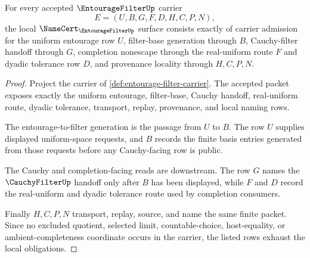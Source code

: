 \begin{theorem}
\label{thm:entourage-filter-namecert-obligations}
For every accepted $\EntourageFilterUp$ carrier
$$
E=(U,B,G,F,D,H,C,P,N),
$$
the local $\NameCert_{\EntourageFilterUp}$ surface consists exactly of carrier admission for the uniform entourage row $U$, filter-base generation through $B$, Cauchy-filter handoff through $G$, completion nonescape through the real-uniform route $F$ and dyadic tolerance row $D$, and provenance locality through $H,C,P,N$.
\end{theorem}
\begin{proof}
Project the carrier of \autoref{def:entourage-filter-carrier}. The accepted packet exposes exactly the uniform entourage, filter-base, Cauchy handoff, real-uniform route, dyadic tolerance, transport, replay, provenance, and local naming rows.

The entourage-to-filter generation is the passage from $U$ to $B$. The row $U$ supplies displayed uniform-space requests, and $B$ records the finite basis entries generated from those requests before any Cauchy-facing row is public.

The Cauchy and completion-facing reads are downstream. The row $G$ names the $\CauchyFilterUp$ handoff only after $B$ has been displayed, while $F$ and $D$ record the real-uniform and dyadic tolerance route used by completion consumers.

Finally $H,C,P,N$ transport, replay, source, and name the same finite packet. Since no excluded quotient, selected limit, countable-choice, host-equality, or ambient-completeness coordinate occurs in the carrier, the listed rows exhaust the local obligations.
\end{proof}

